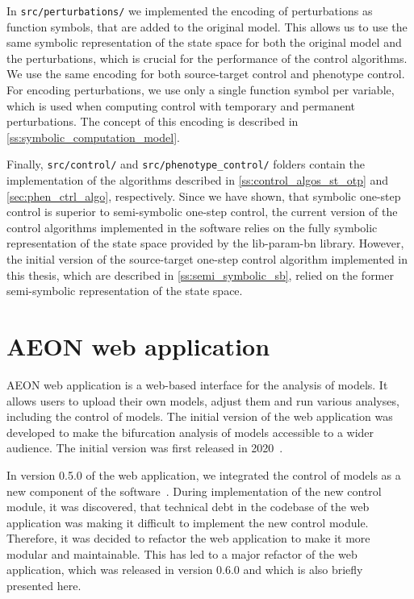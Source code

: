 In \texttt{src/perturbations/} we implemented the encoding of perturbations as function symbols, that are added to the original \PBN{} model. This allows us to use the same symbolic representation of the state space for both the original model and the perturbations, which is crucial for the performance of the control algorithms. We use the same encoding for both source-target control and phenotype control. For encoding perturbations, we use only a single function symbol per variable, which is used when computing control with temporary and permanent perturbations. The concept of this encoding is described in \autoref{ss:symbolic_computation_model}.

Finally, \texttt{src/control/} and \texttt{src/phenotype\_control/} folders contain the implementation of the algorithms described in \autoref{ss:control_algos_st_otp} and \autoref{sec:phen_ctrl_algo}, respectively. Since we have shown, that symbolic one-step control is superior to semi-symbolic one-step control, the current version of the control algorithms implemented in the software relies on the fully symbolic representation of the state space provided by the lib-param-bn library. However, the initial version of the source-target one-step control algorithm implemented in this thesis, which are described in \autoref{ss:semi_symbolic_sb}, relied on the former semi-symbolic representation of the state space.

\section{AEON web application}
\label{sec:aeon_web_app}

AEON web application is a web-based interface for the analysis of \PBN{} models. It allows users to upload their own models, adjust them and run various analyses, including the control of \PBN{} models. The initial version of the web application was developed to make the bifurcation analysis of \PBN{} models accessible to a wider audience. The initial version was first released in 2020~\cite{aeon}. 

In version 0.5.0 of the web application, we integrated the control of \PBN{} models as a new component of the software~\cite{Vesely2025}. During implementation of the new control module, it was discovered, that technical debt in the codebase of the web application was making it difficult to implement the new control module. Therefore, it was decided to refactor the web application to make it more modular and maintainable. This has led to a major refactor of the web application, which was released in version 0.6.0 and which is also briefly presented here.

